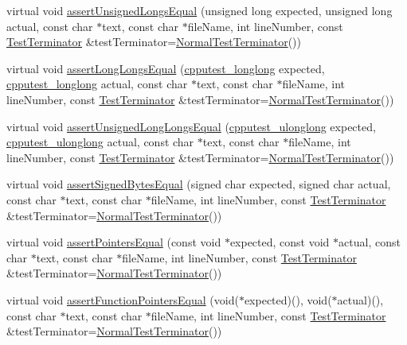 \begin{DoxyCompactItemize}
virtual void \hyperlink{class_utest_shell_a5520c1138fffb8b742427512ba45f7c9}{assert\+Unsigned\+Longs\+Equal} (unsigned long expected, unsigned long actual, const char $\ast$text, const char $\ast$file\+Name, int line\+Number, const \hyperlink{class_test_terminator}{Test\+Terminator} \&test\+Terminator=\hyperlink{class_normal_test_terminator}{Normal\+Test\+Terminator}())
\item 
virtual void \hyperlink{class_utest_shell_a6e6e9c53326383b31d85583ccf4be4c3}{assert\+Long\+Longs\+Equal} (\hyperlink{structcpputest__longlong}{cpputest\+\_\+longlong} expected, \hyperlink{structcpputest__longlong}{cpputest\+\_\+longlong} actual, const char $\ast$text, const char $\ast$file\+Name, int line\+Number, const \hyperlink{class_test_terminator}{Test\+Terminator} \&test\+Terminator=\hyperlink{class_normal_test_terminator}{Normal\+Test\+Terminator}())
\item 
virtual void \hyperlink{class_utest_shell_ac4b53cc2ffb947f2e6ac8c19a531dfbb}{assert\+Unsigned\+Long\+Longs\+Equal} (\hyperlink{structcpputest__ulonglong}{cpputest\+\_\+ulonglong} expected, \hyperlink{structcpputest__ulonglong}{cpputest\+\_\+ulonglong} actual, const char $\ast$text, const char $\ast$file\+Name, int line\+Number, const \hyperlink{class_test_terminator}{Test\+Terminator} \&test\+Terminator=\hyperlink{class_normal_test_terminator}{Normal\+Test\+Terminator}())
\item 
virtual void \hyperlink{class_utest_shell_a74cb755b0e6c2186aa9735dc87e2d7ac}{assert\+Signed\+Bytes\+Equal} (signed char expected, signed char actual, const char $\ast$text, const char $\ast$file\+Name, int line\+Number, const \hyperlink{class_test_terminator}{Test\+Terminator} \&test\+Terminator=\hyperlink{class_normal_test_terminator}{Normal\+Test\+Terminator}())
\item 
virtual void \hyperlink{class_utest_shell_a511e5e49c21105966eee9f600a342455}{assert\+Pointers\+Equal} (const void $\ast$expected, const void $\ast$actual, const char $\ast$text, const char $\ast$file\+Name, int line\+Number, const \hyperlink{class_test_terminator}{Test\+Terminator} \&test\+Terminator=\hyperlink{class_normal_test_terminator}{Normal\+Test\+Terminator}())
\item 
virtual void \hyperlink{class_utest_shell_a48b33046ec189f0ce733205276afafa7}{assert\+Function\+Pointers\+Equal} (void($\ast$expected)(), void($\ast$actual)(), const char $\ast$text, const char $\ast$file\+Name, int line\+Number, const \hyperlink{class_test_terminator}{Test\+Terminator} \&test\+Terminator=\hyperlink{class_normal_test_terminator}{Normal\+Test\+Terminator}())

\end{DoxyCompactItemize}
